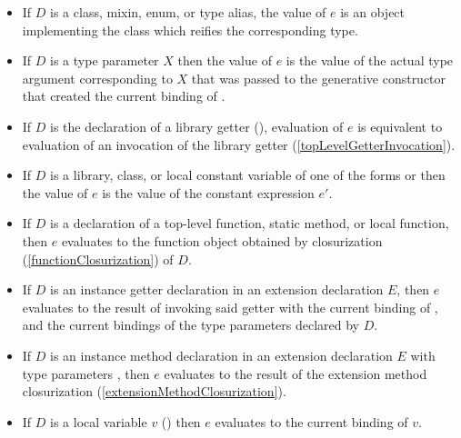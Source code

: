 \documentclass[makeidx]{article}
\begin{document}
{\begin{itemize}
\item
  If $D$ is a class, mixin, enum, or type alias,
  the value of $e$ is an object implementing the class 
  which reifies the corresponding type.
\item
  If $D$ is a type parameter $X$ then the value of $e$ is
  the value of the actual type argument corresponding to $X$
  that was passed to the generative constructor that created
  the current binding of \THIS.
\item
  If $D$ is the declaration of a library getter
  (),
  evaluation of $e$ is equivalent to evaluation of an invocation of
  the library getter \id{}
  (\ref{topLevelGetterInvocation}).
\item
  If $D$ is a library, class, or local constant variable of one of the forms
   or 
  then the value of $e$ is the value of the constant expression $e'$.
\item
  If $D$ is a declaration of
  a top-level function, static method, or local function,
  then $e$ evaluates to the function object obtained by closurization
  (\ref{functionClosurization})
  of $D$.
\item
  If $D$ is an instance getter declaration in an extension declaration $E$,
  then $e$ evaluates to the result of invoking said getter
  with the current binding of \THIS, and
  the current bindings of the type parameters declared by $D$.
\item
  If $D$ is an instance method declaration in an extension declaration $E$
  with type parameters ,
  then $e$ evaluates to the result of the extension method closurization
  (\ref{extensionMethodClosurization}).
\item
  If $D$ is a local variable $v$
  ()
  then $e$ evaluates to the current binding of $v$.
\end{itemize}

\EndCase

}
\end{document}
